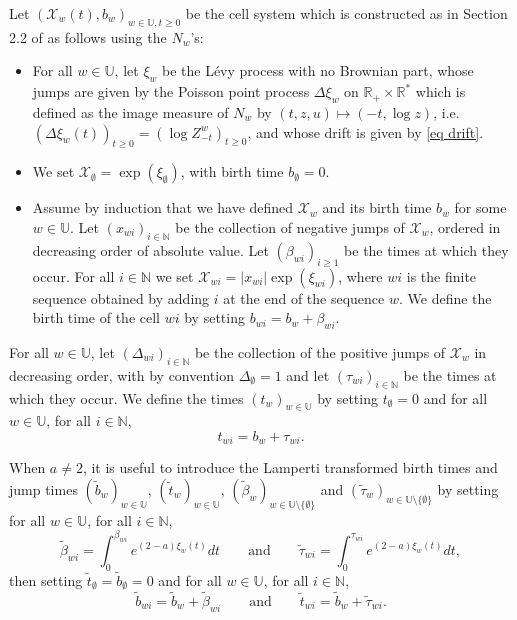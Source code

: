 \documentclass[11pt]{article}
\numberwithin{equation}{section}
\def \R{\mathbb {R}}
\def \N{\mathbb{N}}
\def \U{\mathbb{U}}
\begin{document}
Let $(\mathcal{X}_w(t), b_w)_{w \in \U, t\ge 0}$ be the cell system which is constructed as in Section 2.2 of \cite{BBCK} as follows using the $N_w$'s: 
\begin{itemize}
	\item For all $w\in \U$, let $\xi_w$ be the L\'evy process with no Brownian part, whose jumps are given by the Poisson point process $\Delta \xi_w$ on $\R_+\times \R^*$ which is defined as the image measure of $N_w$ by $(t,z,u)\mapsto (-t, \log z)$, i.e. $(\Delta \xi_w(t))_{t\ge 0} = (\log Z^w_{-t})_{t\ge 0}$, and whose drift is given by \eqref{eq drift}.
	\item We set $\mathcal{X}_\emptyset = \exp(\xi_\emptyset)$, with birth time $b_\emptyset =0$. %
	\item Assume by induction that we have defined $\mathcal{X}_w$ and its birth time $b_w$ for some $w \in \U$. Let $(x_{wi})_{i\in \N}$ be the collection of negative jumps of $\mathcal{X}_w$, ordered in decreasing order of absolute value. Let $(\beta_{wi})_{i\ge 1}$ be the times at which they occur. For all $i \in \N$ we set $\mathcal{X}_{wi} =\vert x_{wi} \vert \exp(\xi_{wi})$, where $wi$ is the finite sequence obtained by adding $i$ at the end of the sequence $w$. We define the birth time of the cell $wi$ by setting $b_{wi}= b_w+\beta_{wi}$. 
\end{itemize}

For all $w\in \U$, let $(\Delta_{wi})_{i\in \N}$ be the collection of the positive jumps of $\mathcal{X}_{w}$ in decreasing order, with by convention $\Delta_\emptyset = 1$ and let $(\tau_{wi})_{i\in \N}$ be the times at which they occur. We define the times $(t_w)_{w\in \U}$ by setting $t_\emptyset =0$ and for all $w \in \U$, for all $i \in\N$, 
$$
t_{wi} = b_w+\tau_{wi}.
$$

When $a\neq 2$, it is useful to introduce the Lamperti transformed birth times and jump times $(\widetilde{b}_w)_{w \in \U}$, $(\widetilde{t}_w)_{w \in \U}$, $(\widetilde{\beta}_w)_{w \in \U \setminus \{\emptyset\}}$ and $(\widetilde{\tau}_w)_{w \in \U\setminus\{\emptyset\}}$ by setting for all $w\in \U$, for all $i \in \N$,
$$
\widetilde{\beta}_{wi} = \int_0^{\beta_{wi}} e^{(2-a) \xi_w(t)} dt 
\qquad
\text{and}
\qquad
\widetilde{\tau}_{wi} = \int_0^{\tau_{wi}} e^{(2-a) \xi_w(t)} dt,
$$
then setting $\widetilde{t}_\emptyset = \widetilde{b}_\emptyset=0$ and for all $w \in \U$, for all $i \in \N$,
$$
\widetilde{b}_{wi} = \widetilde{b}_w + \widetilde{\beta}_{wi} \qquad
\text{and}
 \qquad
\widetilde{t}_{wi} = \widetilde{b}_w+ \widetilde{\tau}_{wi}.
$$
\end{document}
